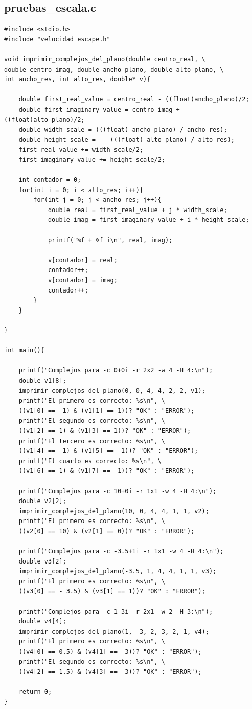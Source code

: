\documentclass[a4paper,10pt]{article}
\begin{document}
\subsection{pruebas\_escala.c}
\begin{verbatim}
#include <stdio.h>
#include "velocidad_escape.h"

void imprimir_complejos_del_plano(double centro_real, \
double centro_imag, double ancho_plano, double alto_plano, \
int ancho_res, int alto_res, double* v){
	
	double first_real_value = centro_real - ((float)ancho_plano)/2;
    double first_imaginary_value = centro_imag + ((float)alto_plano)/2;
    double width_scale = (((float) ancho_plano) / ancho_res);
    double height_scale =  - (((float) alto_plano) / alto_res);
    first_real_value += width_scale/2;
    first_imaginary_value += height_scale/2;
    
	int contador = 0;
    for(int i = 0; i < alto_res; i++){
        for(int j = 0; j < ancho_res; j++){
			double real = first_real_value + j * width_scale;
			double imag = first_imaginary_value + i * height_scale;
			
			printf("%f + %f i\n", real, imag);
			
			v[contador] = real;
			contador++;
			v[contador] = imag;
			contador++;
		}
	}

}

int main(){

	printf("Complejos para -c 0+0i -r 2x2 -w 4 -H 4:\n");
    double v1[8];
    imprimir_complejos_del_plano(0, 0, 4, 4, 2, 2, v1);
	printf("El primero es correcto: %s\n", \
	((v1[0] == -1) & (v1[1] == 1))? "OK" : "ERROR");
	printf("El segundo es correcto: %s\n", \
	((v1[2] == 1) & (v1[3] == 1))? "OK" : "ERROR");
	printf("El tercero es correcto: %s\n", \
	((v1[4] == -1) & (v1[5] == -1))? "OK" : "ERROR");
	printf("El cuarto es correcto: %s\n", \
	((v1[6] == 1) & (v1[7] == -1))? "OK" : "ERROR");
	
	printf("Complejos para -c 10+0i -r 1x1 -w 4 -H 4:\n");
    double v2[2];
    imprimir_complejos_del_plano(10, 0, 4, 4, 1, 1, v2);
	printf("El primero es correcto: %s\n", \
	((v2[0] == 10) & (v2[1] == 0))? "OK" : "ERROR");
	
	printf("Complejos para -c -3.5+1i -r 1x1 -w 4 -H 4:\n");
    double v3[2];
    imprimir_complejos_del_plano(-3.5, 1, 4, 4, 1, 1, v3);
	printf("El primero es correcto: %s\n", \
	((v3[0] == - 3.5) & (v3[1] == 1))? "OK" : "ERROR");
	
	printf("Complejos para -c 1-3i -r 2x1 -w 2 -H 3:\n");
    double v4[4];
    imprimir_complejos_del_plano(1, -3, 2, 3, 2, 1, v4);
	printf("El primero es correcto: %s\n", \
	((v4[0] == 0.5) & (v4[1] == -3))? "OK" : "ERROR");
	printf("El segundo es correcto: %s\n", \
	((v4[2] == 1.5) & (v4[3] == -3))? "OK" : "ERROR");
	
	return 0;
}

\end{verbatim}
\end{document}
